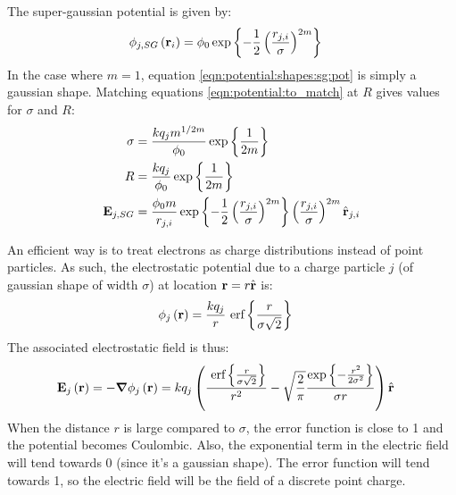 The super-gaussian potential is given by:
\begin{align}
\phi_{j,SG}\left( \textbf{r}_i \right) & = \phi_0 \exp{ \left\{ 
                            -\frac{1}{2} \left( \frac{r_{j,i}}{\sigma} \right)^{2m}
                         \right\}}
\label{eqn:potential:shapes:sg:pot}
\end{align}
In the case where $m = 1$, equation \ref{eqn:potential:shapes:sg:pot} is simply
a gaussian shape. Matching equations \eqref{eqn:potential:to_match} at $R$ gives
values for $\sigma$ and $R$:
\begin{subequations}
\begin{align}
\sigma  & = \frac{k q_j m^{1/2m}}{\phi_0} \exp{ \left\{ \frac{1}{2m} \right\}} \\
R       & = \frac{k q_j}{\phi_0} \exp{ \left\{ \frac{1}{2m} \right\}} \\
\textbf{E}_{j,SG} & = \frac{\phi_0 m}{r_{j,i}}
                \exp{ \left\{ -\frac{1}{2} \left( \frac{r_{j,i}}{\sigma} \right)^{2m} \right\}}
                \left(  \frac{r_{j,i}}{\sigma}  \right)^{2m}
                \hat{\textbf{r}}_{j,i}
\end{align}
\label{eqn:potential:shapes:sg}
\end{subequations}





An efficient way is to treat electrons as charge distributions instead of point
particles. As such, the electrostatic potential due to a charge particle $j$
(of gaussian shape of width $\sigma$) at location $\textbf{r} = r \hat{\textbf{r}}$ is:
\begin{align}
\phi_{j}\left( \textbf{r} \right) & = \frac{k q_j}{r} ~\textrm{erf} \left\{\frac{r}{\sigma \sqrt{2}}\right\}
\label{eqn:md:smoothed:phi}
\end{align}
The associated electrostatic field is thus:
\begin{align}
\textbf{E}_{j}\left( \textbf{r} \right) & = -\bm{\nabla} \phi_j\left( \textbf{r} \right) = k q_j \left( 
    \frac{ ~\textrm{erf} \left\{\frac{r}{\sigma\sqrt{2}}\right\} }{r^2}
    - \sqrt{\frac{2}{\pi}} \frac{ \exp{ \left\{ -\frac{r^2}{2 \sigma^2} \right\}} }{\sigma r}
 \right) \hat{\textbf{r}}
\label{eqn:md:smoothed:E}
\end{align}
When the distance $r$ is large compared to $\sigma$, the error function
is close to 1 and the potential becomes Coulombic. Also, the exponential
term in the electric field will tend towards 0 (since it's a gaussian shape).
The error function will tend towards 1, so the electric field will
be the field of a discrete point charge.

